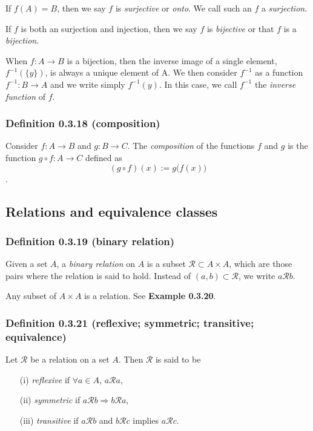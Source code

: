\documentclass[12pt, letterpaper, oneside]{book}
\begin{document}
If $f(A) = B$, then we say $f$ is \textit{surjective} or \textit{onto}. We call
such an $f$ a \textit{surjection}.

If $f$ is both an surjection and injection, then we say $f$ is
\textit{bijective} or that $f$ is a \textit{bijection}.

When $f: A \rightarrow B$ is a bijection, then the inverse image of a single
element, $f^{-1}(\{y\})$, is always a unique element of A. We then consider
$f^{-1}$ as a function $f^{-1}: B \rightarrow A$ and we write simply
$f^{-1}(y)$. In this case, we call $f^{-1}$ the \textit{inverse function} of
$f$.

\subsubsection*{Definition 0.3.18 (composition)}

Consider $f: A \rightarrow B$ and $g: B \rightarrow C$. The \textit{composition}
of the functions $f$ and $g$ is the function $g \circ f: A \rightarrow C$
defined as \[(g \circ f)(x) := g \bigl(f(x)\bigr)\].

\subsection{Relations and equivalence classes}

\subsubsection*{Definition 0.3.19 (binary relation)}

Given a set $A$, a \textit{binary relation} on $A$ is a subset $\mathcal{R}
\subset A \times A$, which are those pairs where the relation is said to hold.
Instead of $(a, b) \subset \mathcal{R}$, we write $a \mathcal{R} b$.

Any subset of $A \times A$ is a relation. See \textbf{Example 0.3.20}.

\subsubsection*{
  Definition 0.3.21 (reflexive; symmetric; transitive; equivalence)
}

Let $\mathcal{R}$ be a relation on a set $A$. Then $\mathcal{R}$ is said to be
\begin{enumerate}
  \item[(i)] \textit{reflexive} if $\forall a \in A$, $a \mathcal{R} a$,
  \item[(ii)] \textit{symmetric} if $a \mathcal{R} b \Rightarrow b \mathcal{R}
    a$,
  \item[(iii)] \textit{transitive} if $a \mathcal{R} b$ and $b \mathcal{R} c$
    implies $a \mathcal{R} c$.
\end{enumerate}
\end{document}
